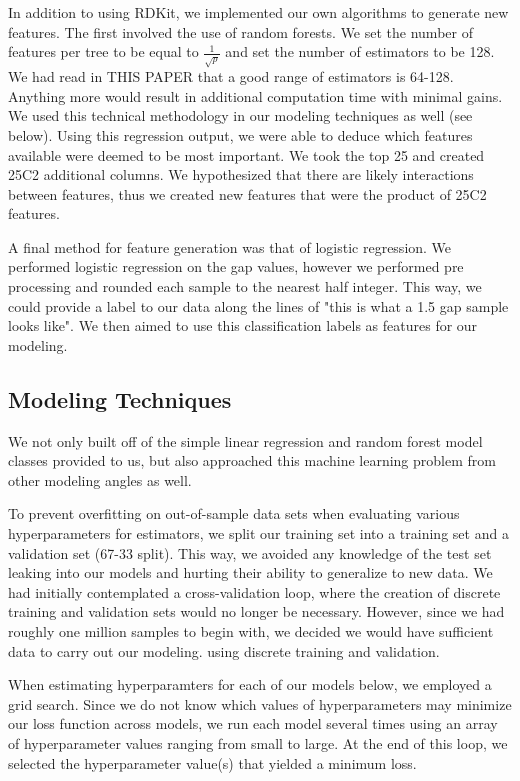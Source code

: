 \documentclass[11pt, oneside]{article}   	%
\begin{document}
In addition to using RDKit, we implemented our own algorithms to generate new features. The first involved the use of random forests. We set the number of features per tree to be equal to $\frac{1}{\sqrt{p}}$ and set the number of estimators to be 128. We had read in THIS PAPER that a good range of estimators is 64-128. Anything more would result in additional computation time with minimal gains. We used this technical methodology in our modeling techniques as well (see below). Using this regression output, we were able to deduce which features available were deemed to be most important. We took the top 25 and created 25C2 additional columns. We hypothesized that there are likely interactions between features, thus we created new features that were the product of 25C2 features. 

A final method for feature generation was that of logistic regression. We performed logistic regression on the gap values, however we performed pre processing and rounded each sample to the nearest half integer. This way, we could provide a label to our data along the lines of "this is what a 1.5 gap sample looks like". We then aimed to use this classification labels as features for our modeling.

\subsection{Modeling Techniques} 

We not only built off of the simple linear regression and random forest model classes provided to us, but also approached this machine learning problem from other modeling angles as well. 

To prevent overfitting on out-of-sample data sets when evaluating various hyperparameters for estimators, we split our training set into a training set and a validation set (67-33 split). This way, we avoided any knowledge of the test set leaking into our models and hurting their ability to generalize to new data. We had initially contemplated a cross-validation loop, where the creation of discrete training and validation sets would no longer be necessary. However, since we had roughly one million samples to begin with, we decided we would have sufficient data to carry out our modeling. using discrete training and validation.

When estimating hyperparamters for each of our models below, we employed a grid search. Since we do not know which values of hyperparameters may minimize our loss function across models, we run each model several times using an array of hyperparameter values ranging from small to large. At the end of this loop, we selected the hyperparameter value(s) that yielded a minimum loss. 
\end{document}
